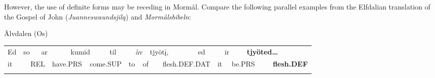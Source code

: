 \begin{styleBodytextC}
However, the use of definite forms may be receding in Mormål. Compare the following parallel examples from the Elfdalian translation of the Gospel of John (\textit{Juanneswaundsjilą}) and \textit{Mormålsbibeln}:

\end{styleBodytextC}

\begin{listWWNumileveli}
\item {}

\end{listWWNumileveli}

\begin{listWWNumxxviileveli}
\item {}

\begin{styleExLtrTbl}
Älvdalen (Os)

\end{styleExLtrTbl}

\end{listWWNumxxviileveli}

\begin{tabular}{llllllllllllllllllll}
\lsptoprule
Ed & \multicolumn{2}{l}{so

} & \multicolumn{2}{l}{ar

} & \multicolumn{2}{l}{kumid

} & \multicolumn{2}{l}{til

} & \multicolumn{2}{l}{åv

} & \multicolumn{2}{l}{tjyöt\k{i},

} & \multicolumn{2}{l}{ed

} & \multicolumn{2}{l}{ir

} & \multicolumn{2}{l}{{\bfseries tjyöted…}

} & \\
\multicolumn{2}{l}{it

} & \multicolumn{2}{l}{REL

} & \multicolumn{2}{l}{have.PRS

} & \multicolumn{2}{l}{come.SUP

} & \multicolumn{2}{l}{to

} & \multicolumn{2}{l}{of

} & \multicolumn{2}{l}{flesh.DEF.DAT

} & \multicolumn{2}{l}{it

} & \multicolumn{2}{l}{be.PRS

} & \multicolumn{2}{l}{{\bfseries flesh.DEF}

}\\
\lspbottomrule
\end{tabular}

